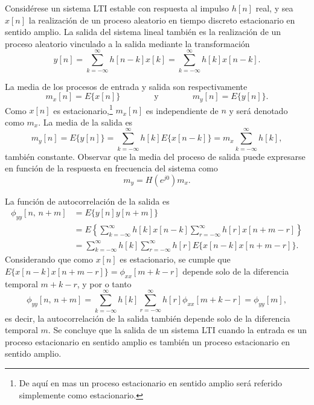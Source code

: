 \documentclass[a4paper]{report}
\begin{document}
Considérese un sistema LTI estable con respuesta al impulso \(h[n]\) real, y sea \(x[n]\) la realización de un proceso aleatorio en tiempo discreto estacionario en sentido amplio. 
La salida del sistema lineal también es la realización de un proceso aleatorio vinculado a la salida mediante la transformación
\[
 y[n]=\sum_{k=-\infty}^\infty h[n-k]x[k]=\sum_{k=-\infty}^\infty h[k]x[n-k].
\]

La media de los procesos de entrada y salida son respectivamente
\[
 m_x[n]=E\{x[n]\}
 \qquad\qquad\textrm{y}\qquad\qquad
 m_y[n]=E\{y[n]\}.
\]
Como \(x[n]\) es estacionario,\footnote{De aquí en mas un proceso estacionario en sentido amplio será referido simplemente como estacionario.} \(m_x[n]\) es independiente de \(n\) y será denotado como \(m_x\). La media de la salida es
\[
 m_y[n]=E\{y[n]\}=\sum_{k=-\infty}^\infty h[k]E\{x[n-k]\}=m_x\sum_{k=-\infty}^\infty h[k],
\]
también constante. Observar que la media del proceso de salida puede expresarse en función de la respuesta en frecuencia del sistema como
\[
 m_y=H(e^{j0})m_x.
\]

La función de autocorrelación de la salida es
\begin{align*}
 \phi_{yy}[n,\,n+m]&=E\{y[n]y[n+m]\}\\
   &=E\left\{\sum_{k=-\infty}^\infty h[k]x[n-k]\sum_{r=-\infty}^\infty h[r]x[n+m-r]\right\}\\
   &=\sum_{k=-\infty}^\infty h[k]\sum_{r=-\infty}^\infty h[r]E\{x[n-k]x[n+m-r]\}.
\end{align*}
Considerando que como \(x[n]\) es estacionario, se cumple que \(E\{x[n-k]x[n+m-r]\}=\phi_{xx}[m+k-r]\) depende solo de la diferencia temporal \(m+k-r\), y por o tanto
\begin{equation}\label{eq:seq_and_sys_random_lti_output_autocorrelation}
 \phi_{yy}[n,\,n+m]=\sum_{k=-\infty}^\infty h[k]\sum_{r=-\infty}^\infty h[r]\phi_{xx}[m+k-r]=\phi_{yy}[m], 
\end{equation}
es decir, la autocorrelación de la salida también depende solo de la diferencia temporal \(m\). Se concluye que la salida de un sistema LTI cuando la entrada es un proceso estacionario en sentido amplio es también un proceso estacionario en sentido amplio.
 
\end{document}

